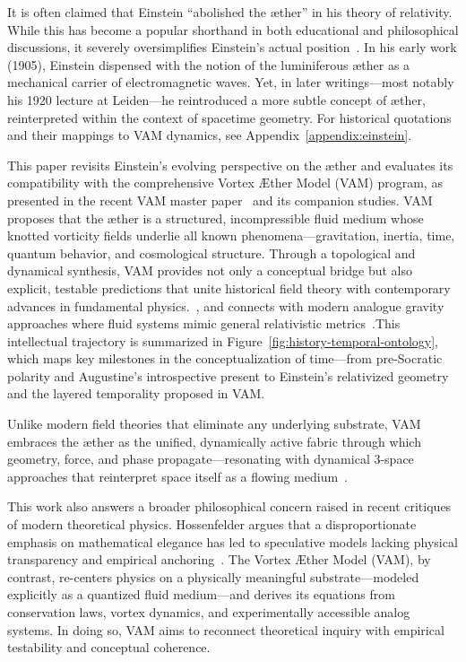 It is often claimed that Einstein ``abolished the æther'' in his theory of relativity. While this has become a popular shorthand in both educational and philosophical discussions, it severely oversimplifies Einstein's actual position~\cite{einstein1920aether}. In his early work (1905), Einstein dispensed with the notion of the luminiferous æther as a mechanical carrier of electromagnetic waves. Yet, in later writings—most notably his 1920 lecture at Leiden—he reintroduced a more subtle concept of æther, reinterpreted within the context of spacetime geometry.
For historical quotations and their mappings to VAM dynamics, see Appendix~\ref{appendix:einstein}.


This paper revisits Einstein’s evolving perspective on the æther and evaluates its compatibility with the comprehensive Vortex Æther Model (VAM) program, as presented in the recent VAM master paper~\cite{VAM-8} and its companion studies. VAM proposes that the æther is a structured, incompressible fluid medium whose knotted vorticity fields underlie all known phenomena—gravitation, inertia, time, quantum behavior, and cosmological structure. Through a topological and dynamical synthesis, VAM provides not only a conceptual bridge but also explicit, testable predictions that unite historical field theory with contemporary advances in fundamental physics.~\cite{VAM-11, VAM-15}, and connects with modern analogue gravity approaches where fluid systems mimic general relativistic metrics~\cite{barcelo2005}.This intellectual trajectory is summarized in Figure~\ref{fig:history-temporal-ontology}, which maps key milestones in the conceptualization of time—from pre-Socratic polarity and Augustine’s introspective present to Einstein’s relativized geometry and the layered temporality proposed in VAM.



Unlike modern field theories that eliminate any underlying substrate, VAM embraces the æther as the unified, dynamically active fabric through which geometry, force, and phase propagate—resonating with dynamical 3-space approaches that reinterpret space itself as a flowing medium~\cite{cahill2003dynamical}.

This work also answers a broader philosophical concern raised in recent critiques of modern theoretical physics. Hossenfelder argues that a disproportionate emphasis on mathematical elegance has led to speculative models lacking physical transparency and empirical anchoring~\cite{hossenfelder2018lost}. The Vortex Æther Model (VAM), by contrast, re-centers physics on a physically meaningful substrate—modeled explicitly as a quantized fluid medium—and derives its equations from conservation laws, vortex dynamics, and experimentally accessible analog systems. In doing so, VAM aims to reconnect theoretical inquiry with empirical testability and conceptual coherence.

